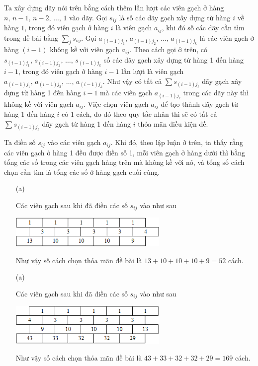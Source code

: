 Ta xây dựng dãy nói trên bằng cách thêm lần lượt các viên gạch ở hàng $n,\,n-1,\,n-2,\,\ldots,\,1$ vào dãy. Gọi $s_{ij}$ là số các dãy gạch xây dựng từ hàng $i$ về hàng $1$, trong đó viên gạch ở hàng $i$ là viên gạch $a_{ij}$, khi đó số các dãy cần tìm trong đề bài bằng $\displaystyle\sum\limits_{j}s_{nj}$. Gọi $a_{(i-1)j_1},\,a_{(i-1)j_2},\,\ldots,\,a_{(i-1)j_k}$ là các viên gạch ở hàng $(i-1)$ không kề với viên gạch $a_{ij}$. Theo cách gọi ở trên, có $s_{(i-1)j_1},\,s_{(i-1)j_2},\,\ldots,\,s_{(i-1)j_k}$ số các dãy gạch xây dựng từ hàng 1 đến hàng $i-1$, trong đó viên gạch ở hàng $i-1$ lần lượt là viên gạch $a_{(i-1)j_1},\,a_{(i-1)j_2},\,\ldots,\,a_{(i-1)j_k}$. Như vậy có tất cả $\displaystyle\sum\limits s_{(i-1)j_\ell}$ dãy gạch xây dựng từ hàng 1 đến hàng $i-1$ mà các viên gạch $a_{(i-1)j_\ell}$ trong các dãy này thì không kề với viên gạch $a_{ij}$. Việc chọn viên gạch $a_{ij}$ để tạo thành dãy gạch từ hàng 1 đến hàng $i$ có 1 cách, do đó theo quy tắc nhân thì sẽ có tất cả $\displaystyle\sum\limits s_{(i-1)j_\ell}$ dãy gạch từ hàng 1 đến hàng $i$ thỏa mãn điều kiện đề.

Ta điền số $s_{ij}$ vào các viên gạch $a_{ij}$. Khi đó, theo lập luận ở trên, ta thấy rằng các viên gạch ở hàng 1 đều được điền số 1, mỗi viên gạch ở hàng dưới thì bằng tổng các số trong các viên gạch hàng trên mà không kề với nó, và tổng số cách chọn cần tìm là tổng các số ở hàng gạch cuối cùng.

\begin{enumerate}
    \item[(a)] {
        Các viên gạch sau khi đã điền các số $s_{ij}$ vào như sau 
        \begin{center}
            \includegraphics[width=0.6\textwidth]{Figures/07.png}
        \end{center}
        Như vậy số cách chọn thỏa mãn đề bài là $13+10+10+10+9 = 52$ cách.
    }
    \item[(a)] {
        Các viên gạch sau khi đã điền các số $s_{ij}$ vào như sau 
        \begin{center}
            \includegraphics[width=0.6\textwidth]{Figures/08.png}
        \end{center}
        Như vậy số cách chọn thỏa mãn đề bài là $43+33+32+32+29=169$ cách.
    }
\end{enumerate}

